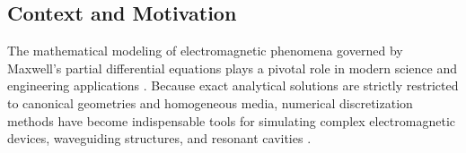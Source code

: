 \documentclass[preprint,12pt]{elsarticle}
\begin{document}
\subsection{Context and Motivation}
\label{subsec:context_motivation}

The mathematical modeling of electromagnetic phenomena governed by Maxwell's partial differential equations plays a pivotal role in modern science and engineering applications \cite{jin2014finite, harrington2001time}. Because exact analytical solutions are strictly restricted to canonical geometries and homogeneous media, numerical discretization methods have become indispensable tools for simulating complex electromagnetic devices, waveguiding structures, and resonant cavities \cite{jin2014finite, monk2003finite}.
\end{document}
